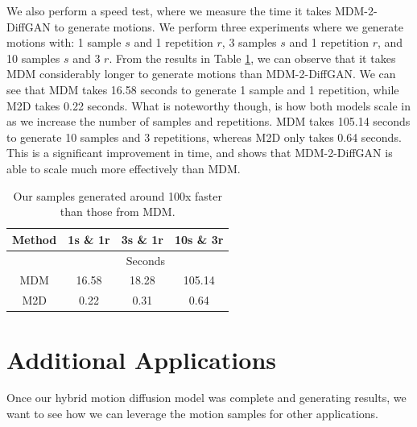 \documentclass[10pt,twocolumn,letterpaper]{article}
\begin{document}
\newpage

We also perform a speed test, where we measure the time it takes MDM-2-DiffGAN to generate motions. We perform 
three experiments where we generate motions with: 1 sample $s$ and 1 repetition $r$, 3 samples $s$ and 1 repetition $r$, and 10 samples 
$s$ and 3 $r$. From the results in Table \ref{tab:time}, we can observe that it takes MDM considerably longer to generate motions 
than MDM-2-DiffGAN. We can see that MDM takes 16.58 seconds to generate 1 sample and 1 repetition, while M2D takes 0.22 seconds. 
What is noteworthy though, is how both models scale in as we increase the number of samples and repetitions. MDM takes 105.14 seconds 
to generate 10 samples and 3 repetitions, whereas M2D only takes 0.64 seconds. This is a significant improvement in time, and shows that 
MDM-2-DiffGAN is able to scale much more effectively than MDM. 

\begin{table}[]
    \centering
    \begin{tabular}{|c|ccc|}
    \hline
    Method & \multicolumn{1}{c|}{1s \& 1r} & \multicolumn{1}{c|}{3s \& 1r} & 10s \& 3r \\ \hline
           & \multicolumn{3}{c|}{Seconds}                                              \\ \hline
    MDM    & \multicolumn{1}{c|}{16.58}    & \multicolumn{1}{c|}{18.28}    & 105.14    \\ \hline
    M2D    & \multicolumn{1}{c|}{0.22}     & \multicolumn{1}{c|}{0.31}     & 0.64      \\ \hline
    \end{tabular}
    \caption{Our samples generated around 100x faster than those from MDM.}
    \label{tab:time}
\end{table}

\newpage

\section{Additional Applications}
\label{sec:additional-applications}

Once our hybrid motion diffusion model was complete and generating results, we want to see how we can
leverage the motion samples for other applications. 
\end{document}

